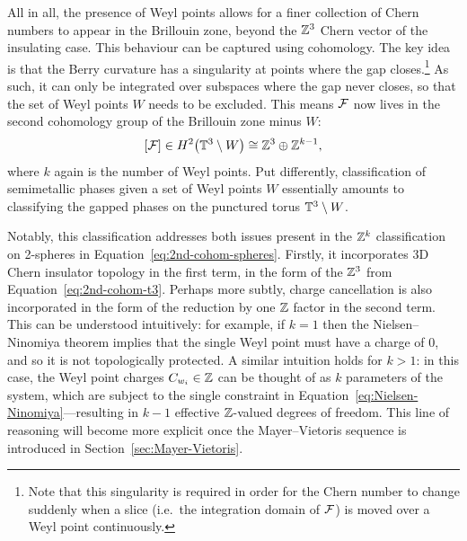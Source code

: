 All in all, the presence of Weyl points allows for a finer collection of Chern numbers to appear in the Brillouin zone, beyond the $\mathbb{Z}^3$ Chern vector of the insulating case. This behaviour can be captured using cohomology. The key idea is that the Berry curvature has a singularity at points where the gap closes.\footnote{
	Note that this singularity is required in order for the Chern number to change suddenly when a slice (i.e.\ the integration domain of $\mathcal{F}$) is moved over a Weyl point continuously.}
As such, it can only be integrated over subspaces where the gap never closes, so that the set of Weyl points $W$ needs to be excluded. This means $\mathcal{F}$ now lives in the second cohomology group of the Brillouin zone minus $W$:
\begin{equation}\label{eq:2nd-cohom-semimetal}
	[\mathcal{F}]\in H^2\big(\mathbb{T}^3\setminus W\big) \cong \mathbb{Z}^3\oplus\mathbb{Z}^{k-1},
\end{equation}
where $k$ again is the number of Weyl points. Put differently, classification of semimetallic phases given a set of Weyl points $W$ essentially amounts to classifying the gapped phases on the punctured torus $\mathbb{T}^3\setminus W$.

Notably, this classification addresses both issues present in the $\mathbb{Z}^k$ classification on 2-spheres in Equation~\eqref{eq:2nd-cohom-spheres}. Firstly, it incorporates 3D Chern insulator topology in the first term, in the form of the $\mathbb{Z}^3$ from Equation~\eqref{eq:2nd-cohom-t3}. Perhaps more subtly, charge cancellation is also incorporated in the form of the reduction by one $\mathbb{Z}$ factor in the second term. This can be understood intuitively: for example, if $k=1$ then the Nielsen--Ninomiya theorem implies that the single Weyl point must have a charge of 0, and so it is not topologically protected. A similar intuition holds for $k>1$: in this case, the Weyl point charges $C_{w_i}\in\mathbb{Z}$ can be thought of as $k$ parameters of the system, which are subject to the single constraint in Equation~\eqref{eq:Nielsen-Ninomiya}---resulting in $k-1$ effective $\mathbb{Z}$-valued degrees of freedom. This line of reasoning will become more explicit once the Mayer--Vietoris sequence is introduced in Section~\ref{sec:Mayer-Vietoris}.




